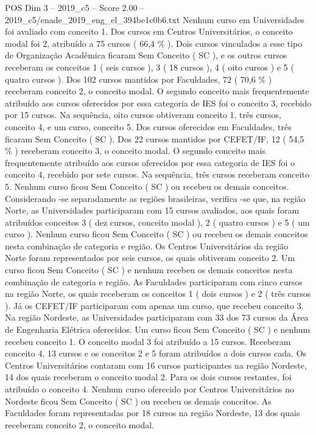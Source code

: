\begin{textsample}{POS Dim 3 – 2019\_c5 – Score 2.00 – 2019\_c5/enade\_2019\_eng\_el\_394be1c0b6.txt}
Nenhum curso em Universidades foi avaliado com conceito 1.
Dos cursos em Centros Universitários, o conceito modal foi 2, atribuído a 75 cursos ( 66,4 \% ).
Dois cursos vinculados a esse tipo de Organização Acadêmica ficaram Sem Conceito ( SC ), e os outros cursos receberam os conceitos 1 ( seis cursos ), 3 ( 18 cursos ), 4 ( oito cursos ) e 5 ( quatro cursos ).
Dos 102 cursos mantidos por Faculdades, 72 ( 70,6 \% ) receberam conceito 2, o conceito modal.
O segundo conceito mais frequentemente atribuído aos cursos oferecidos por essa categoria de IES foi o conceito 3, recebido por 15 cursos.
Na sequência, oito cursos obtiveram conceito 1, três cursos, conceito 4, e um curso, conceito 5.
Dos cursos oferecidos em Faculdades, três ficaram Sem Conceito ( SC ).
Dos 22 cursos mantidos por CEFET/IF, 12 ( 54,5 \% ) receberam conceito 3, o conceito modal.
O segundo conceito mais frequentemente atribuído aos cursos oferecidos por essa categoria de IES foi o conceito 4, recebido por sete cursos.
Na sequência, três cursos receberam conceito 5.
Nenhum curso ficou Sem Conceito ( SC ) ou recebeu os demais conceitos.
Considerando -se separadamente as regiões brasileiras, verifica -se que, na região Norte, as Universidades participaram com 15 cursos avaliados, aos quais foram atribuídos conceitos 3 ( dez cursos, conceito modal ), 2 ( quatro cursos ) e 5 ( um curso ).
Nenhum curso ficou Sem Conceito ( SC ) ou recebeu os demais conceitos nesta combinação de categoria e região.
Os Centros Universitários da região Norte foram representados por seis cursos, os quais obtiveram conceito 2.
Um curso ficou Sem Conceito ( SC ) e nenhum recebeu os demais conceitos nesta combinação de categoria e região.
As Faculdades participaram com cinco cursos na região Norte, os quais receberam os conceitos 1 ( dois cursos ) e 2 ( três cursos ).
Já os CEFET/IF participaram com apenas um curso, que recebeu conceito 3.
Na região Nordeste, as Universidades participaram com 33 dos 73 cursos da Área de Engenharia Elétrica oferecidos.
Um curso ficou Sem Conceito ( SC ) e nenhum recebeu conceito 1.
O conceito modal 3 foi atribuído a 15 cursos.
Receberam conceito 4, 13 cursos e os conceitos 2 e 5 foram atribuídos a dois cursos cada.
Os Centros Universitários contaram com 16 cursos participantes na região Nordeste, 14 dos quais receberam o conceito modal 2.
Para os dois cursos restantes, foi atribuído o conceito 4.
Nenhum curso oferecido por Centros Universitários no Nordeste ficou Sem Conceito ( SC ) ou recebeu os demais conceitos.
As Faculdades foram representadas por 18 cursos na região Nordeste, 13 dos quais receberam conceito 2, o conceito modal.

\end{textsample}
